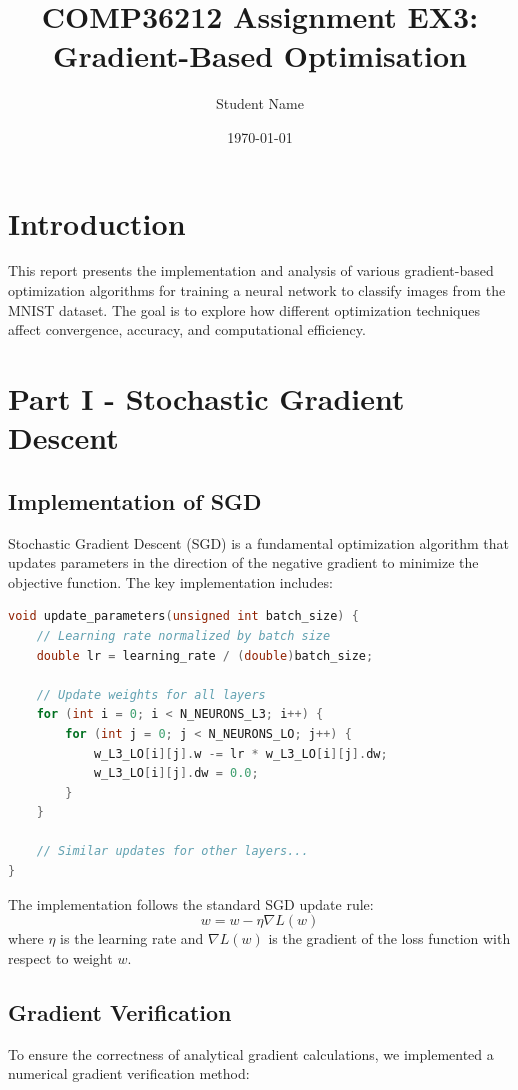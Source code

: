 \documentclass{article}
\title{COMP36212 Assignment EX3: Gradient-Based Optimisation}
\author{Student Name}
\date{\today}
\begin{document}
\maketitle

\section{Introduction}
This report presents the implementation and analysis of various gradient-based optimization algorithms for training a neural network to classify images from the MNIST dataset. The goal is to explore how different optimization techniques affect convergence, accuracy, and computational efficiency.

\section{Part I - Stochastic Gradient Descent}

\subsection{Implementation of SGD}
Stochastic Gradient Descent (SGD) is a fundamental optimization algorithm that updates parameters in the direction of the negative gradient to minimize the objective function. The key implementation includes:

\begin{lstlisting}[language=C]
void update_parameters(unsigned int batch_size) {
    // Learning rate normalized by batch size
    double lr = learning_rate / (double)batch_size;
    
    // Update weights for all layers
    for (int i = 0; i < N_NEURONS_L3; i++) {
        for (int j = 0; j < N_NEURONS_LO; j++) {
            w_L3_LO[i][j].w -= lr * w_L3_LO[i][j].dw;
            w_L3_LO[i][j].dw = 0.0;
        }
    }
    
    // Similar updates for other layers...
}
\end{lstlisting}

The implementation follows the standard SGD update rule:
\begin{equation}
w = w - \eta \nabla L(w)
\end{equation}
where $\eta$ is the learning rate and $\nabla L(w)$ is the gradient of the loss function with respect to weight $w$.

\subsection{Gradient Verification}
To ensure the correctness of analytical gradient calculations, we implemented a numerical gradient verification method:
\end{document}

